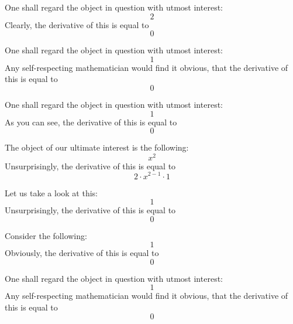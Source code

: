 \documentclass{article}
\begin{document}
One shall regard the object in question with utmost interest:
\begin{equation}
2 
\end{equation}
Clearly, the derivative of this is equal to
\begin{equation}
0 
\end{equation}

One shall regard the object in question with utmost interest:
\begin{equation}
1 
\end{equation}
Any self-respecting mathematician would find it obvious, that the derivative of this is equal to
\begin{equation}
0 
\end{equation}

One shall regard the object in question with utmost interest:
\begin{equation}
1 
\end{equation}
As you can see, the derivative of this is equal to
\begin{equation}
0 
\end{equation}

The object of our ultimate interest is the following:
\begin{equation}
x ^{2 } 
\end{equation}
Unsurprisingly, the derivative of this is equal to
\begin{equation}
2 \cdot x ^{2 - 1 } \cdot 1 
\end{equation}

Let us take a look at this:
\begin{equation}
1 
\end{equation}
Unsurprisingly, the derivative of this is equal to
\begin{equation}
0 
\end{equation}

Consider the following:
\begin{equation}
1 
\end{equation}
Obviously, the derivative of this is equal to
\begin{equation}
0 
\end{equation}

One shall regard the object in question with utmost interest:
\begin{equation}
1 
\end{equation}
Any self-respecting mathematician would find it obvious, that the derivative of this is equal to
\begin{equation}
0 
\end{equation}
\end{document}
